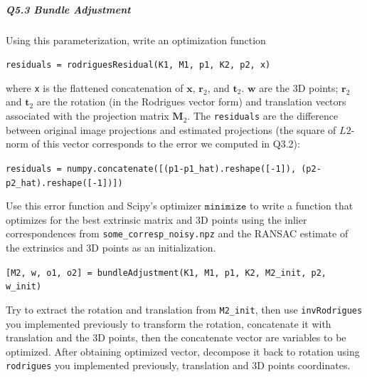 \subparagraph*{Q5.3 Bundle Adjustment}

Using this parameterization, write an optimization function
\begin{center}
\texttt{residuals = rodriguesResidual(K1, M1, p1, K2, p2, x)}
\end{center}
where \texttt{x} is the flattened concatenation of $\mathbf{x}$, $\mathbf{r}_2$, and $\mathbf{t}_2$. $\mathbf{w}$ are the 3D points; $\mathbf{r}_2$ and $\mathbf{t}_2$ are the rotation (in the Rodrigues vector form) and translation vectors associated with the projection matrix $\mathbf{M}_2$. The \texttt{residuals} are the difference between original image projections and estimated projections (the square of $L2$-norm of this vector corresponds to the error we computed in Q3.2):
\begin{center}
\texttt{residuals = numpy.concatenate([(p1-p1\_hat).reshape([-1]), (p2-p2\_hat).reshape([-1])])}
\end{center}

Use this error function and Scipy's optimizer $\texttt{minimize}$ to write a function that optimizes for the best extrinsic matrix and 3D points using the inlier correspondences from \texttt{some\_corresp\_noisy.npz} and the RANSAC estimate of the extrinsics and 3D points as an initialization.

\begin{center}
\texttt{[M2, w, o1, o2] = bundleAdjustment(K1, M1, p1, K2, M2\_init, p2, w\_init)}
\end{center}

Try to extract the rotation and translation from \texttt{M2\_init}, then use \texttt{invRodrigues} you implemented previously to transform the rotation, concatenate it with translation and the 3D points, then the concatenate vector are variables to be optimized. After obtaining optimized vector, decompose it back to rotation using \texttt{rodrigues} you implemented previously, translation and 3D points coordinates.


